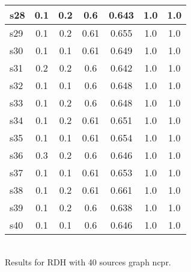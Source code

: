 \documentclass{article}
\begin{document}
\begin{tabular}{|l|c|c|c|c|c|c|}
\hline
s28 &0.1 & 0.2 & 0.6 & 0.643 & 1.0 & 1.0\\
\hline
s29 &0.1 & 0.2 & 0.61 & 0.655 & 1.0 & 1.0\\
\hline
s30 &0.1 & 0.1 & 0.61 & 0.649 & 1.0 & 1.0\\
\hline
s31 &0.2 & 0.2 & 0.6 & 0.642 & 1.0 & 1.0\\
\hline
s32 &0.1 & 0.1 & 0.6 & 0.648 & 1.0 & 1.0\\
\hline
s33 &0.1 & 0.2 & 0.6 & 0.648 & 1.0 & 1.0\\
\hline
s34 &0.1 & 0.2 & 0.61 & 0.651 & 1.0 & 1.0\\
\hline
s35 &0.1 & 0.1 & 0.61 & 0.654 & 1.0 & 1.0\\
\hline
s36 &0.3 & 0.2 & 0.6 & 0.646 & 1.0 & 1.0\\
\hline
s37 &0.1 & 0.1 & 0.61 & 0.653 & 1.0 & 1.0\\
\hline
s38 &0.1 & 0.2 & 0.61 & 0.661 & 1.0 & 1.0\\
\hline
s39 &0.1 & 0.2 & 0.6 & 0.638 & 1.0 & 1.0\\
\hline
s40 &0.1 & 0.1 & 0.6 & 0.646 & 1.0 & 1.0\\
\hline
\end{tabular}\\

\noindent Results for RDH with 40 sources graph ncpr.
\end{document}
